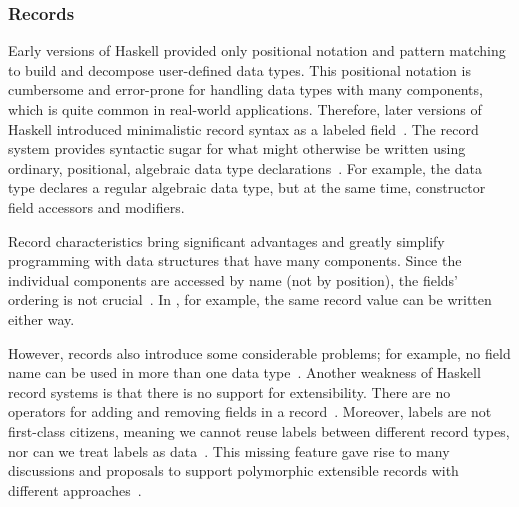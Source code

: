 \begin{frame}\frametitle{Records}
    
    Early versions of Haskell provided only positional notation and pattern matching to build and decompose user-defined data types. This positional notation is cumbersome and error-prone for handling data types with many components, which is quite common in real-world applications. Therefore, later versions of Haskell introduced minimalistic record syntax as a labeled field~\cite{lw-ext-records, history-of-haskell}.
The record system provides syntactic sugar for what might 
otherwise be written using ordinary, positional, 
algebraic data type declarations~\cite{lw-ext-records}. For example, 
the data type  declares a regular algebraic data type, 
but at the same time, 
constructor field accessors and modifiers. 


Record characteristics bring significant advantages and greatly simplify programming with data structures that have many components. Since the individual components are accessed by name (not by position), the fields' ordering is not crucial~\cite{lw-ext-records}.
In , for example, 
the same record value can be written either way.

However, records also introduce some considerable problems; for example, 
no field name can be used in more than one data type~\cite{lw-ext-records}.
Another weakness of Haskell record systems is that there is no support for extensibility. 
There are no operators for adding and removing fields in a record~\cite{poly-ext-records, hlist}. 
Moreover, labels are not first-class citizens, 
meaning we cannot reuse labels between different record types, 
nor can we treat labels as data~\cite{hlist}.
This missing feature gave rise to many discussions and proposals to support polymorphic extensible records with different approaches~\cite{history-of-haskell, poly-ext-records, hlist, basic-tlp}.

\end{frame}


